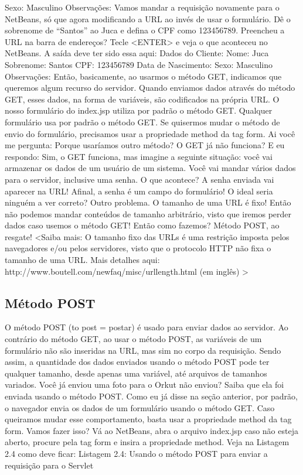 Sexo: Masculino
Observações:
Vamos mandar a requisição novamente para o NetBeans, só que agora modificando a URL ao invés de usar o formulário. Dê o sobrenome de “Santos” ao Juca e defina o CPF como 123456789. Preencheu a URL na barra de endereços? Tecle <ENTER> e veja o que aconteceu no NetBeans. A saída deve ter sido essa aqui:
Dados do Cliente:
Nome: Juca
Sobrenome: Santos
CPF: 123456789
Data de Nascimento: 
Sexo: Masculino
Observações:
Então, basicamente, ao usarmos o método GET, indicamos que queremos algum recurso do servidor. Quando enviamos dados através do método GET, esses dados, na forma de variáveis, são codificados na própria URL. O nosso formulário do index.jsp utiliza por padrão o método GET. Qualquer formulário usa por padrão o método GET. Se quisermos mudar o método de envio do formulário, precisamos usar a propriedade method da tag form. Ai você me pergunta: Porque usaríamos outro método? O GET já não funciona? E eu respondo: Sim, o GET funciona, mas imagine a seguinte situação: você vai armazenar os dados de um usuário de um sistema. Você vai mandar vários dados para o servidor, inclusive uma senha. O que acontece? A senha enviada vai aparecer na URL! Afinal, a senha é um campo do formulário! O ideal seria ninguém a ver correto? Outro problema. O tamanho de uma URL é fixo! Então não podemos mandar conteúdos de tamanho arbitrário, visto que iremos perder dados caso usemos o método GET! Então como fazemos? Método POST, ao resgate!
<Saiba mais:
O tamanho fixo das URLs é uma restrição imposta pelos navegadores e/ou pelos servidores, visto que o protocolo HTTP não fixa o tamanho de uma URL. Mais detalhes aqui: http://www.boutell.com/newfaq/misc/urllength.html (em inglês)
>



\subsection{Método POST}

O método POST (to post = postar) é usado para enviar dados ao servidor. Ao contrário do método GET, ao usar o método POST, as variáveis de um formulário não são inseridas na URL, mas sim no corpo da requisição. Sendo assim, a quantidade dos dados enviados usando o método POST pode ter qualquer tamanho, desde apenas uma variável, até arquivos de tamanhos variados. Você já enviou uma foto para o Orkut não enviou? Saiba que ela foi enviada usando o método POST.
Como eu já disse na seção anterior, por padrão, o navegador envia os dados de um formulário usando o método GET. Caso queiramos mudar esse comportamento, basta usar a propriedade method da tag form. Vamos fazer isso? Vá ao NetBeans, abra o arquivo index.jsp caso não esteja aberto, procure pela tag form e insira a propriedade method. Veja na Listagem 2.4 como deve ficar:
Listagem 2.4: Usando o método POST para enviar a requisição para o Servlet
 
